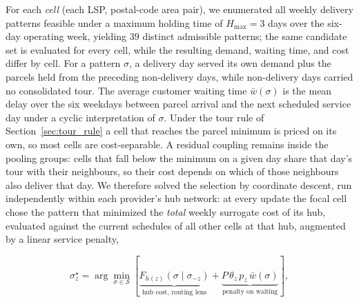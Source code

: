 \documentclass[preprint,12pt,authoryear]{elsarticle}
\begin{document}
For each \emph{cell} (each LSP, postal-code area pair), we enumerated all weekly delivery patterns feasible under a maximum holding time of $H_{\max}=3$ days over the six-day operating week, yielding $39$ distinct admissible patterns; the same candidate set is evaluated for every cell, while the resulting demand, waiting time, and cost differ by cell. For a pattern $\sigma$, a delivery day served its own demand plus the parcels held from the preceding non-delivery days, while non-delivery days carried no consolidated tour. The average customer waiting time $\bar{w}(\sigma)$ is the mean delay over the six weekdays between parcel arrival and the next scheduled service day under a cyclic interpretation of $\sigma$. Under the tour rule of Section~\ref{sec:tour_rule} a cell that reaches the parcel minimum is priced on its own, so most cells are cost-separable. A residual coupling remains inside the pooling groups: cells that fall below the minimum on a given day share that day's tour with their neighbours, so their cost depends on which of those neighbours also deliver that day. We therefore solved the selection by coordinate descent, run independently within each provider's hub network: at every update the focal cell chose the pattern that minimized the \emph{total} weekly surrogate cost of its hub, evaluated against the current schedules of all other cells at that hub, augmented by a linear service penalty,

\begin{equation}
\label{eq:schedule_objective}
\sigma_z^{\star} = \arg\min_{\sigma \in \mathcal{S}} \left[ \underbrace{F_{h(z)}(\sigma \mid \sigma_{-z})}_{\text{hub cost, routing lens}} + \underbrace{P \, \theta_z \, p_z \, \bar{w}(\sigma)}_{\text{penalty on waiting}} \right],
\end{equation}
\end{document}
